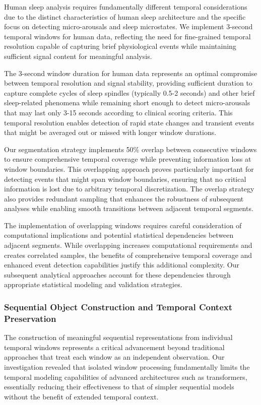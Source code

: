 \documentclass[a4paper,12pt,twoside]{article}
\begin{document}
Human sleep analysis requires fundamentally different temporal considerations due to the distinct characteristics of human sleep architecture and the specific focus on detecting micro-arousals and sleep microstates. We implement 3-second temporal windows for human data, reflecting the need for fine-grained temporal resolution capable of capturing brief physiological events while maintaining sufficient signal content for meaningful analysis.

The 3-second window duration for human data represents an optimal compromise between temporal resolution and signal stability, providing sufficient duration to capture complete cycles of sleep spindles (typically 0.5-2 seconds) and other brief sleep-related phenomena while remaining short enough to detect micro-arousals that may last only 3-15 seconds according to clinical scoring criteria. This temporal resolution enables detection of rapid state changes and transient events that might be averaged out or missed with longer window durations.

Our segmentation strategy implements 50\% overlap between consecutive windows to ensure comprehensive temporal coverage while preventing information loss at window boundaries. This overlapping approach proves particularly important for detecting events that might span window boundaries, ensuring that no critical information is lost due to arbitrary temporal discretization. The overlap strategy also provides redundant sampling that enhances the robustness of subsequent analyses while enabling smooth transitions between adjacent temporal segments.

The implementation of overlapping windows requires careful consideration of computational implications and potential statistical dependencies between adjacent segments. While overlapping increases computational requirements and creates correlated samples, the benefits of comprehensive temporal coverage and enhanced event detection capabilities justify this additional complexity. Our subsequent analytical approaches account for these dependencies through appropriate statistical modeling and validation strategies.

\subsubsection{Sequential Object Construction and Temporal Context Preservation}

The construction of meaningful sequential representations from individual temporal windows represents a critical advancement beyond traditional approaches that treat each window as an independent observation. Our investigation revealed that isolated window processing fundamentally limits the temporal modeling capabilities of advanced architectures such as transformers, essentially reducing their effectiveness to that of simpler sequential models without the benefit of extended temporal context.
\end{document}
